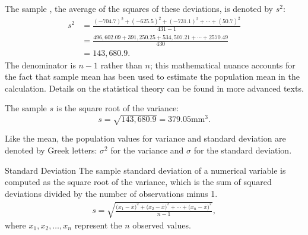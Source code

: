The sample \label{varianceFirstDiscussed}, the average of the squares of these deviations, is denoted by $s^2$:
\begin{align*}
s^2 &= \frac{(-704.7)^2 + (-625.5)^2 + (-731.1)^2 + \cdots + (50.7)^2}{431-1} \\
&= \frac{496,602.09 + 391,250.25 + 534,507.21 + \cdots + 2570.49}{430} \\
&= 143,680.9.
\end{align*}
The denominator is $n-1$ rather than $n$; this mathematical nuance accounts for the fact that sample mean has been used to estimate the population mean in the calculation. Details on the statistical theory can be found in more advanced texts. 

The sample  $s$ is the square root of the variance:
$$s=\sqrt{143,680.9} = 379.05 \textrm{mm}^{3}.$$

Like the mean, the population values for variance and standard deviation are denoted by Greek letters:
$\sigma_{}^2$ for the variance and $\sigma$ for the standard deviation.


\begin{onebox}{Standard Deviation}
		The sample standard deviation of a numerical variable is computed as the square root of the variance, which is the sum of squared deviations divided by the number of observations minus 1.
		\begin{eqnarray}
		s = \sqrt{\frac{({x_1 - \overline{x})}^{2}+({x_2 - \overline{x})}^{2}+\cdots+({x_n - \overline{x})}^{2}}{n-1}},
		\label{SDEquation}
		\end{eqnarray}
		where $x_1, x_2, \dots, x_n$ represent the $n$ observed values.
\end{onebox}

